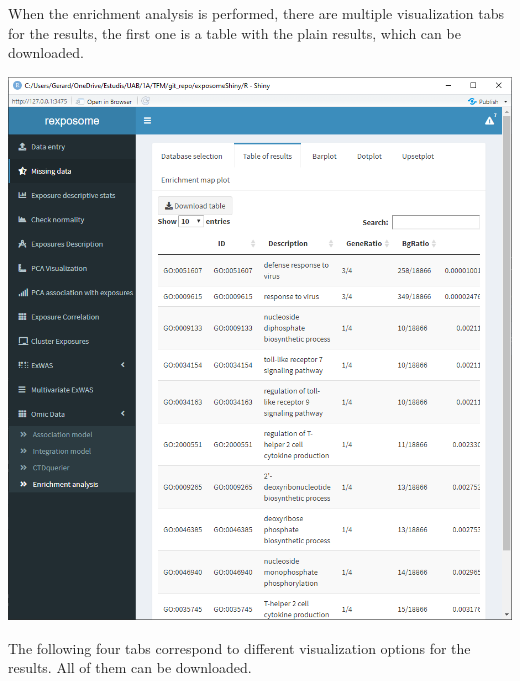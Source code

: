 \documentclass[
]{book}
\begin{document}
When the enrichment analysis is performed, there are multiple visualization tabs for the results, the first one is a table with the plain results, which can be downloaded.

\includegraphics{images/analysis11_2.png}

The following four tabs correspond to different visualization options for the results. All of them can be downloaded.
\end{document}
